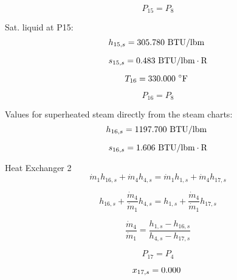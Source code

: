 \documentclass{article}
\begin{document}
\begin{equation}
P_{15} = P_{ 8}
\end{equation}

Sat. liquid at P15:
\begin{equation}
  h_{15,s} =  305.780\textnormal{ BTU/lbm                   }
\end{equation}

\begin{equation}
  s_{15,s} =    0.483\textnormal{ BTU/lbm}\cdot\textnormal{R}
\end{equation}

\begin{equation}
T_{16} =  330.000\textnormal{ \(^{\circ}\)F             }
\end{equation}

\begin{equation}
P_{16} = P_{ 8}
\end{equation}

Values for superheated steam directly from the steam charts:
\begin{equation}
  h_{16,s} = 1197.700\textnormal{ BTU/lbm                   }
\end{equation}

\begin{equation}
  s_{16,s} =    1.606\textnormal{ BTU/lbm}\cdot\textnormal{R}
\end{equation}


Heat Exchanger 2
\begin{equation}
\dot{m}_{ 1}h_{16,s} + \dot{m}_{ 4}h_{ 4,s} = \dot{m}_{ 1}h_{ 1,s} + \dot{m}_{ 4}h_{17,s}
\end{equation}

\begin{equation}
h_{16,s} + \frac{\dot{m}_{ 4}}{\dot{m}_{ 1}}h_{ 4,s} = h_{ 1,s} + \frac{\dot{m}_{ 4}}{\dot{m}_{ 1}}h_{17,s}
\end{equation}

\begin{equation}
\frac{\dot{m}_{4}}{\dot{m}_{1}} = \frac{h_{1,s} - h_{16,s}}{h_{4,s} - h_{17,s}}
\end{equation}

\begin{equation}
P_{17} = P_{ 4}
\end{equation}

\begin{equation}
  x_{17,s} =    0.000\textnormal{                           }
\end{equation}
\end{document}
